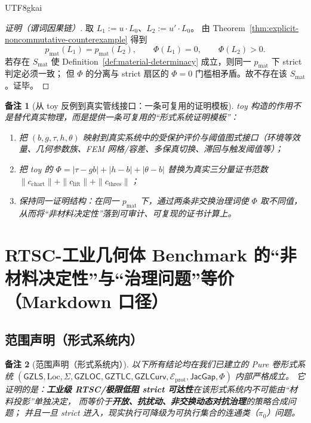 \documentclass[12pt]{article}
\newtheorem{remark}{备注}[section]
\newcommand{\GZLS}{\ensuremath{\mathsf{GZLS}}}
\newcommand{\GZLOC}{\ensuremath{\mathsf{GZLOC}}}
\newcommand{\GZLCurv}{\ensuremath{\mathsf{GZLCurv}}}
\newcommand{\GZTLC}{\ensuremath{\mathsf{GZTLC}}}
\newcommand{\JacGap}{\ensuremath{\mathsf{JacGap}}}
\newcommand{\RTSC}{\textsf{RTSC}}
\begin{document}
\begin{CJK*}{UTF8}{gkai}
\begin{proof}[证明（谓词因果链）]
取 $L_1:=u\cdot L_0$、$L_2:=u'\cdot L_0$。
由 Theorem~\ref{thm:explicit-noncommutative-counterexample} 得到
\[
p_{\mathrm{mat}}(L_1)=p_{\mathrm{mat}}(L_2),\qquad \Phi(L_1)=0,\qquad \Phi(L_2)>0.
\]
若存在 $S_{\mathrm{mat}}$ 使 Definition~\ref{def:material-determinacy} 成立，则同一 $p_{\mathrm{mat}}$ 下 strict 判定必须一致；
但 $\Phi$ 的分离与 strict 扇区的 $\Phi=0$ 门槛相矛盾。故不存在该 $S_{\mathrm{mat}}$。证毕。
\end{proof}

\begin{remark}[从 toy 反例到真实管线接口：一条可复用的证明模板]
toy 构造的作用不是替代真实物理，而是提供一条可复用的“形式系统证明模板”：
\begin{enumerate}
  \item 把 $(b,g,\tau,h,\theta)$ 映射到真实系统中的受保护评价与阈值图式接口（环境等效量、几何参数族、FEM 网格/容差、多保真切换、滞回与触发阈值等）；
  \item 把 toy 的 $\Phi=|\tau-gb|+|h-b|+|\theta-b|$ 替换为真实三分量证书范数 $\|c_{\mathrm{chart}}\|+\|c_{\mathrm{lift}}
    \|+\|c_{\mathrm{thres}}\|$；
  \item 保持同一证明结构：在同一 $p_{\mathrm{mat}}$ 下，通过两条非交换治理词使 $\Phi$ 取不同值，从而将“非材料决定性”落到可审计、可复现的证书计算上。
\end{enumerate}
\end{remark}

\clearpage
\section{\RTSC{}-工业几何体 Benchmark 的“非材料决定性”与“治理问题”等价（Markdown 口径）}
\label{sec:puremath-markdown-nonmaterial-governance}

\subsection{范围声明（形式系统内）}

\begin{remark}[范围声明（形式系统内）]
以下所有结论均在我们已建立的 Pure 卷形式系统
$(\GZLS,\mathrm{Loc},\Sigma,\GZLOC,\GZTLC,\GZLCurv,\mathcal{E}_{\mathrm{prot}},\JacGap,\Phi)$
内部严格成立。
它证明的是：\textbf{工业级 \RTSC{}/极限低阻 strict 可达性}在该形式系统内不可能由“材料投影”单独决定，
而等价于\textbf{开放、抗扰动、非交换动态对抗治理}的策略合成问题；
并且一旦 strict 进入，现实执行可降级为可执行集合的连通类（$\pi_0$）问题。
\end{remark}


\end{CJK*}
\end{document}
